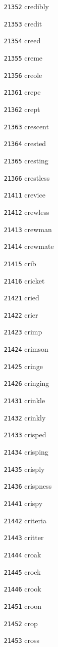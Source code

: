 \documentclass[twoside,11pt]{article}
\begin{document}
\begin{multicols}{5}
\begin{enumerate}
\item[\texttt{21352}] credibly
\item[\texttt{21353}] credit
\item[\texttt{21354}] creed
\item[\texttt{21355}] creme
\item[\texttt{21356}] creole
\item[\texttt{21361}] crepe
\item[\texttt{21362}] crept
\item[\texttt{21363}] crescent
\item[\texttt{21364}] crested
\item[\texttt{21365}] cresting
\item[\texttt{21366}] crestless
\item[\texttt{21411}] crevice
\item[\texttt{21412}] crewless
\item[\texttt{21413}] crewman
\item[\texttt{21414}] crewmate
\item[\texttt{21415}] crib
\item[\texttt{21416}] cricket
\item[\texttt{21421}] cried
\item[\texttt{21422}] crier
\item[\texttt{21423}] crimp
\item[\texttt{21424}] crimson
\item[\texttt{21425}] cringe
\item[\texttt{21426}] cringing
\item[\texttt{21431}] crinkle
\item[\texttt{21432}] crinkly
\item[\texttt{21433}] crisped
\item[\texttt{21434}] crisping
\item[\texttt{21435}] crisply
\item[\texttt{21436}] crispness
\item[\texttt{21441}] crispy
\item[\texttt{21442}] criteria
\item[\texttt{21443}] critter
\item[\texttt{21444}] croak
\item[\texttt{21445}] crock
\item[\texttt{21446}] crook
\item[\texttt{21451}] croon
\item[\texttt{21452}] crop
\item[\texttt{21453}] cross

\end{enumerate}
\end{multicols}
\end{document}
